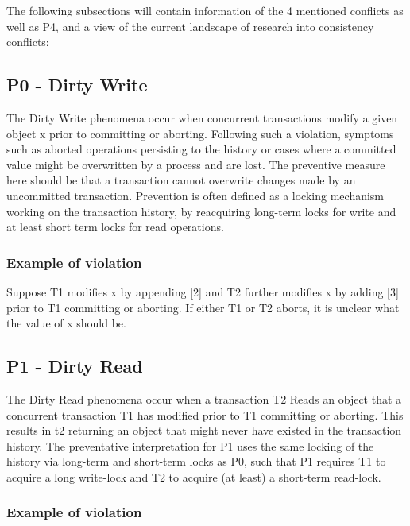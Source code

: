 \documentclass[a4paper,10pt,titlepage]{report}
\begin{document}
The following subsections will contain information of the 4 mentioned conflicts as well as P4, and a view of the current landscape of research into consistency conflicts:
\subsection{P0 - Dirty Write}
The Dirty Write phenomena occur when concurrent transactions modify a given object x prior to committing or aborting. Following such a violation, symptoms such as aborted operations persisting to the history or cases where a committed value might be overwritten by a process and are lost. The preventive measure here should be that a transaction cannot overwrite changes made by an uncommitted transaction. Prevention is often defined as a locking mechanism working on the transaction history, by reacquiring long-term locks for write and at least short term locks for read operations.\\
\vspace{5mm}
\subsubsection{Example of violation}
Suppose T1 modifies x by appending [2] and T2 further modifies x by adding [3] prior to T1 committing or aborting. If either T1 or T2 aborts, it is unclear what the value of x should be. \\

\vspace{2mm}

\vspace{2mm}

\subsection{P1 - Dirty Read}
The Dirty Read phenomena occur when a transaction T2 Reads an object that a concurrent transaction T1 has modified prior to T1 committing or aborting. This results in t2 returning an object that might never have existed in the transaction history. The preventative interpretation for P1 uses the same locking of the history via long-term and short-term locks as P0, such that P1 requires T1 to acquire a long write-lock and T2 to acquire (at least) a short-term read-lock.

\subsubsection{Example of violation}
\end{document}
